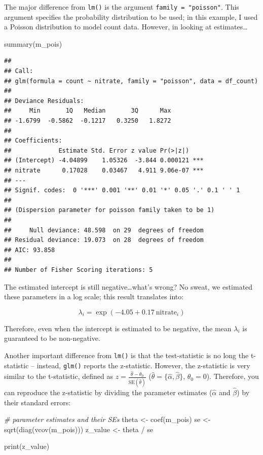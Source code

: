 \documentclass[
]{book}
\newenvironment{Shaded}{\begin{snugshade}}{\end{snugshade}}
\newcommand{\CommentTok}[1]{\textcolor[rgb]{0.56,0.35,0.01}{\textit{#1}}}
\newcommand{\FunctionTok}[1]{\textcolor[rgb]{0.00,0.00,0.00}{#1}}
\newcommand{\NormalTok}[1]{#1}
\newcommand{\OtherTok}[1]{\textcolor[rgb]{0.56,0.35,0.01}{#1}}
\newcommand{\SpecialCharTok}[1]{\textcolor[rgb]{0.00,0.00,0.00}{#1}}
\begin{document}
The major difference from \texttt{lm()} is the argument \texttt{family\ =\ "poisson"}. This argument specifies the probability distribution to be used; in this example, I used a Poisson distribution to model count data. However, in looking at estimates\ldots{}

\begin{Shaded}
\begin{Highlighting}[]
\FunctionTok{summary}\NormalTok{(m\_pois)}
\end{Highlighting}
\end{Shaded}

\begin{verbatim}
## 
## Call:
## glm(formula = count ~ nitrate, family = "poisson", data = df_count)
## 
## Deviance Residuals: 
##     Min       1Q   Median       3Q      Max  
## -1.6799  -0.5862  -0.1217   0.3250   1.8272  
## 
## Coefficients:
##             Estimate Std. Error z value Pr(>|z|)    
## (Intercept) -4.04899    1.05326  -3.844 0.000121 ***
## nitrate      0.17028    0.03467   4.911 9.06e-07 ***
## ---
## Signif. codes:  0 '***' 0.001 '**' 0.01 '*' 0.05 '.' 0.1 ' ' 1
## 
## (Dispersion parameter for poisson family taken to be 1)
## 
##     Null deviance: 48.598  on 29  degrees of freedom
## Residual deviance: 19.073  on 28  degrees of freedom
## AIC: 93.858
## 
## Number of Fisher Scoring iterations: 5
\end{verbatim}

The estimated intercept is still negative\ldots what's wrong? No sweat, we estimated these parameters in a log scale; this result translates into:

\[
\lambda_i = \exp(-4.05 + 0.17~\text{nitrate}_i)
\]

Therefore, even when the intercept is estimated to be negative, the mean \(\lambda_i\) is guaranteed to be non-negative.

Another important difference from \texttt{lm()} is that the test-statistic is no long the t-statistic -- instead, \texttt{glm()} reports the z-statistic. However, the z-statistic is very similar to the t-statistic, defined as \(z=\frac{\hat{\theta} - \theta_0}{\text{SE}(\hat{\theta})}\) (\(\hat{\theta} = \{\hat{\alpha}, \hat{\beta}\}\), \(\theta_0 = 0\)). Therefore, you can reproduce the z-statistic by dividing the parameter estimates (\(\hat{\alpha}\) and \(\hat{\beta}\)) by their standard errors:

\begin{Shaded}
\begin{Highlighting}[]
\CommentTok{\# parameter estimates and their SEs}
\NormalTok{theta }\OtherTok{\textless{}{-}} \FunctionTok{coef}\NormalTok{(m\_pois)}
\NormalTok{se }\OtherTok{\textless{}{-}} \FunctionTok{sqrt}\NormalTok{(}\FunctionTok{diag}\NormalTok{(}\FunctionTok{vcov}\NormalTok{(m\_pois)))}
\NormalTok{z\_value }\OtherTok{\textless{}{-}}\NormalTok{ theta }\SpecialCharTok{/}\NormalTok{ se}

\FunctionTok{print}\NormalTok{(z\_value)}
\end{Highlighting}
\end{Shaded}
\end{document}
